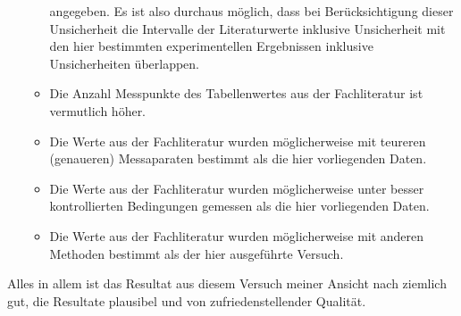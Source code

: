\begin{itemize}
\begin{itemize}
                angegeben. Es   ist   also   durchaus  m\"oglich,   dass   bei
                Ber\"ucksichtigung   dieser    Unsicherheit   die   Intervalle
                der    Literaturwerte   inklusive    Unsicherheit   mit    den
                hier   bestimmten    experimentellen   Ergebnissen   inklusive
                Unsicherheiten \"uberlappen.
            \item
                Die Anzahl Messpunkte des Tabellenwertes aus der Fachliteratur
                ist vermutlich h\"oher.
            \item
                Die Werte  aus der  Fachliteratur wurden  m\"oglicherweise mit
                teureren  (genaueren)  Messaparaten  bestimmt   als  die  hier
                vorliegenden Daten.
            \item
                Die Werte aus der  Fachliteratur wurden m\"oglicherweise unter
                besser  kontrollierten  Bedingungen   gemessen  als  die  hier
                vorliegenden Daten.
            \item
                Die Werte aus der  Fachliteratur wurden m\"oglicherweise mit
                anderen Methoden bestimmt als der hier ausgef\"uhrte Versuch.
        \end{itemize}
\end{itemize}

Alles  in allem  ist  das  Resultat aus  diesem  Versuch  meiner Ansicht  nach
ziemlich gut, die Resultate plausibel und von zufriedenstellender Qualit\"at.

%




